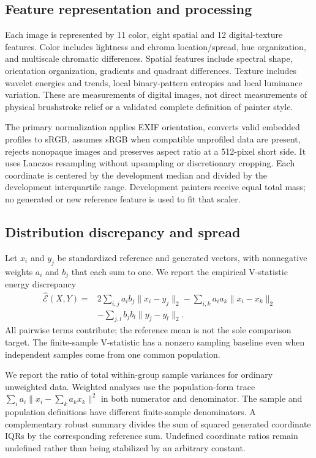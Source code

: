 \documentclass[11pt]{article}
\begin{document}
\subsection{Feature representation and processing}
Each image is represented by 11 color, eight spatial and 12 digital-texture
features. Color includes lightness and chroma location/spread, hue organization,
and multiscale chromatic differences. Spatial features include spectral shape,
orientation organization, gradients and quadrant differences. Texture includes
wavelet energies and trends, local binary-pattern entropies and local luminance
variation. These are measurements of digital images, not direct measurements of
physical brushstroke relief or a validated complete definition of painter style.

The primary normalization applies EXIF orientation, converts valid embedded
profiles to sRGB, assumes sRGB when compatible unprofiled data are present,
rejects nonopaque images and preserves aspect ratio at a 512-pixel short side.
It uses Lanczos resampling without upsampling or discretionary cropping.
Each coordinate is centered by the development median and divided by the
development interquartile range. Development painters receive equal total mass;
no generated or new reference feature is used to fit that scaler.


\subsection{Distribution discrepancy and spread}
Let $x_i$ and $y_j$ be standardized reference and generated vectors, with
nonnegative weights $a_i$ and $b_j$ that each sum to one. We report the empirical
V-statistic energy discrepancy
\begin{align}
\widehat{\mathcal E}(X,Y)={}&2\sum_{i,j}a_i b_j\lVert x_i-y_j\rVert_2
-\sum_{i,k}a_i a_k\lVert x_i-x_k\rVert_2\nonumber\\
&-\sum_{j,l}b_j b_l\lVert y_j-y_l\rVert_2.
\label{eq:energy}
\end{align}
All pairwise terms contribute; the reference mean is not the sole comparison
target. The finite-sample V-statistic has a nonzero sampling baseline even when
independent samples come from one common population.

We report the ratio of total within-group sample variances for ordinary
unweighted data. Weighted analyses use the population-form trace
$\sum_i a_i\lVert x_i-\sum_k a_k x_k\rVert^2$ in both numerator and denominator.
The sample and population definitions have different finite-sample denominators.
A complementary robust summary divides the sum of squared generated coordinate
IQRs by the corresponding reference sum. Undefined coordinate ratios remain
undefined rather than being stabilized by an arbitrary constant.
\end{document}
